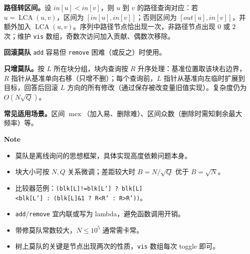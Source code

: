 \textbf{路径转区间。}设 $in[u]<in[v]$，则 $u$ 到 $v$ 的路径查询对应：若 $u=\operatorname{LCA}(u,v)$，区间为 $[in[u],in[v]]$；否则区间为 $[out[u],in[v]]$，并额外加入 $\operatorname{LCA}(u,v)$。序列中路径节点恰出现一次，非路径节点出现 $0$ 或 $2$ 次；维护 \texttt{vis} 数组，奇数次访问加入贡献、偶数次移除。

\textbf{回滚莫队}
\texttt{add} 容易但 \texttt{remove} 困难（或反之）时使用。

\textbf{只增莫队。}按 $L$ 所在块分组，块内查询按 $R$ 升序处理：基准位置取该块右边界，$R$ 指针从基准单向右移（只增不删）；每个查询前，$L$ 指针从基准向左临时扩展到目标，回答后回滚 $L$ 方向的所有修改（通过保存被改变量旧值实现）。复杂度仍为 $O(N\sqrt{Q})$。

\textbf{常见适用场景。}区间 $\operatorname{mex}$（加入易、删除难）、区间众数（删除时需知剩余最大频率）等。

\textbf{Note}
\begin{itemize}
\item 莫队是离线询问的思想框架，具体实现高度依赖问题本身。
\item 块大小可按 $N,Q$ 关系微调；差距较大时 $B=N/\sqrt{Q}$ 优于 $B=\sqrt{N}$。
\item 比较器范例：\texttt{(blk[L]!=blk[L']\ ?\ blk[L]<blk[L']\ :\ (blk[L]\&1\ ?\ R<R'\ :\ R>R'))}。
\item \texttt{add}/\texttt{remove} 宜内联或写为 lambda，避免函数调用开销。
\item 带修莫队常数较大，$N\le 10^5$ 通常需卡常。
\item 树上莫队的关键是节点出现两次的性质，\texttt{vis} 数组每次 toggle 即可。
\end{itemize}
